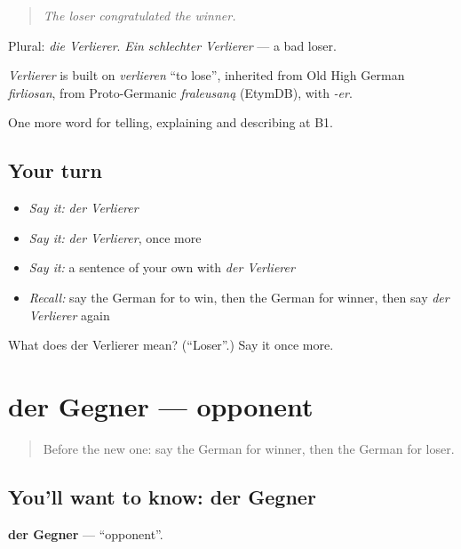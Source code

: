 \begin{quote}
\emph{The loser congratulated the winner.}
\end{quote}

Plural: \emph{die Verlierer}. \emph{Ein schlechter Verlierer} — a bad loser.

\begin{cousinweb}
\emph{Verlierer} is built on \emph{verlieren} \textquotedblleft{}to lose\textquotedblright{}, inherited from Old High German \emph{firliosan}, from Proto-Germanic \emph{fraleusaną} (EtymDB), with \emph{-er}.
\end{cousinweb}

\begin{grammarlens}[title={What you've built}]
One more word for telling, explaining and describing at B1.
\end{grammarlens}

\subsection*{Your turn}
\begin{itemize}
\raggedright
  \item \emph{Say it:} \emph{der Verlierer}
  \item \emph{Say it:} \emph{der Verlierer}, once more
  \item \emph{Say it:} a sentence of your own with \emph{der Verlierer}
  \item \emph{Recall:} say the German for to win, then the German for winner, then say \emph{der Verlierer} again
\end{itemize}

\begin{tcolorbox}[breakable,colback=teal!4,colframe=teal!35!black,title={Before you move on}]
What does der Verlierer mean? (\textquotedblleft{}Loser\textquotedblright{}.) Say it once more.
\end{tcolorbox}
\section[der Gegner]{der Gegner — opponent}

\label{lesson:GE-C508-gegner}



\begin{quote}
Before the new one: say the German for winner, then the German for loser.
\end{quote}

\subsection*{You'll want to know: der Gegner}
\textbf{der Gegner} — \textquotedblleft{}opponent\textquotedblright{}.

